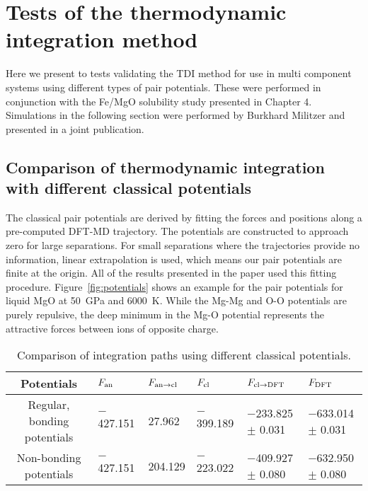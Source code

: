 \section{Tests of the thermodynamic integration method}

Here we present to tests validating the TDI method for use in multi component systems
using different types of pair potentials. These were performed in conjunction with
the Fe/MgO solubility study presented in Chapter 4. Simulations in the following section were
performed by Burkhard Militzer and presented in a joint publication.

\subsection{Comparison of thermodynamic integration with different classical potentials}

The classical pair potentials are derived by fitting the forces and
positions along a pre-computed DFT-MD trajectory. The potentials are
constructed to approach zero for large separations. For small separations
where the trajectories provide no information, linear extrapolation is
used, which means our pair potentials are finite at the origin. All of the
results presented in the paper used this fitting procedure.
Figure~\ref{fig:potentials} shows an example for the pair potentials for
liquid MgO at 50~GPa and 6000~K.  While the Mg-Mg and O-O potentials are
purely repulsive, the deep minimum in the Mg-O potential represents the
attractive forces between ions of opposite charge.

\begin{table}[!h]
    \centering
\caption{Comparison of integration paths using different classical potentials.\label{tab:compare_pots}}
\begin{adjustbox}{max width=\textwidth}
\begin{tabular}{clllll}
\hline
Potentials & $F_{\rm an}$ & $F_{\rm an \to cl}$ & $F_{\rm cl}$ & $F_{\rm cl \to DFT}$ & $F_{\rm DFT}$ \\
\hline
Regular, bonding potentials & $-$427.151 & 27.962 & $-$399.189 & $-$233.825 $\pm$ 0.031 & $-$633.014  $\pm$ 0.031 \\
Non-bonding potentials & $-$427.151 & 204.129 & $-$223.022 & $-$409.927 $\pm$ 0.080 & $-$632.950 $\pm$ 0.080 \\
\hline
\end{tabular}
\end{adjustbox}
\end{table}

